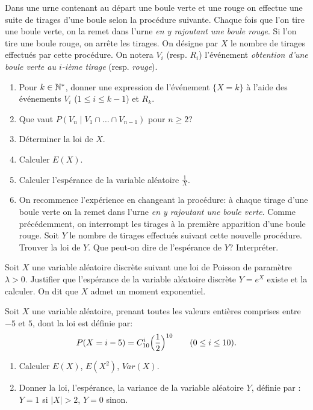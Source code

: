 \documentclass[a4paper,12pt,reqno]{amsart}
\begin{document}
\begin{exo}

  Dans une urne contenant au départ une boule verte et une rouge on effectue une suite de tirages d'une boule selon la procédure suivante. Chaque fois que l'on tire une boule verte, on la remet dans l'urne \emph{en y rajoutant une boule rouge}. Si l'on tire une boule rouge, on arrête les tirages. On désigne par $X$ le nombre de tirages effectués par cette procédure. On notera $V_i$ (resp. $R_i$) l'événement \emph{obtention d'une boule verte au $i$-ième tirage} (resp. \emph{rouge}).

  \begin{enumerate}
    \item Pour $k\in\mathbb{N}^{\ast}$, donner une expression de l'événement $\{X=k\}$ à l'aide des événements $V_i$ ($1\leq i\leq k-1$) et $R_k$.
    \item Que vaut $P(V_n\mid V_1\cap\ldots\cap V_{n-1})$ pour $n\geq 2$?
    \item Déterminer la loi de $X$.
    \item Calculer $E(X)$.
    \item Calculer l'espérance de la variable aléatoire $\frac{1}{X}$.
    \item On recommence l'expérience en changeant la procédure: à chaque tirage d'une boule verte on la remet dans l'urne \emph{en y rajoutant une boule verte}. Comme précédemment, on interrompt les tirages à la première apparition d'une boule rouge. Soit $Y$ le nombre de tirages effectués suivant cette nouvelle procédure. Trouver la loi de $Y$. Que peut-on dire de l'espérance de $Y$? Interpréter.
  \end{enumerate}

\end{exo}

\begin{exo}

  Soit $X$ une variable aléatoire discrète suivant une loi de Poisson de paramètre $\lambda>0$. Justifier que l'espérance de la variable aléatoire discrète $Y=e^X$ existe  et la calculer. On dit que $X$ admet un moment exponentiel.

\end{exo}

\begin{exo}

  Soit $X$ une variable aléatoire, prenant toutes les valeurs entières comprises entre $-5$ et $5$, dont la loi est définie par:
    $$
    P(X=i-5)=C_{10}^i\Bigl(\frac{1}{2}\Bigr)^{10}\qquad (0\leq i\leq 10).
    $$

  \begin{enumerate}
    \item Calculer $E(X)$, $E(X^2)$, $Var(X)$.
    \item Donner la loi, l'espérance, la variance de la variable aléatoire
    $Y$, définie par : $Y=1$ si $|X| > 2$, $Y=0$ sinon.
  \end{enumerate}

\end{exo}
\end{document}

